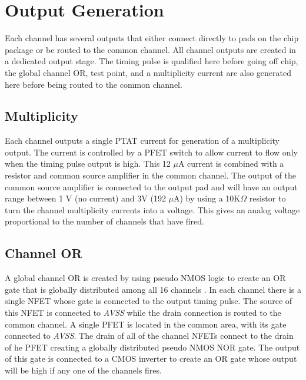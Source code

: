 \documentclass[12pt,oneside,final]{siuethesis}
\theoremstyle{definition}
\begin{document}
\section{Output Generation}
\par Each channel has several outputs that either connect directly to pads on the chip package or be routed to the common channel. All channel outputs are created in a dedicated output stage. The timing pulse is qualified here before going off chip, the global channel OR, test point, and a multiplicity current are also generated here before being routed to the common channel.
\subsection{Multiplicity}
\par Each channel outputs a single PTAT current for generation of a multiplicity output. The current is controlled by a PFET switch to allow current to flow only when the timing pulse output is high. This 12 $\mu$A current is combined with a resistor and common source amplifier in the common channel. The output of the common source amplifier is connected to the output pad and will have an output range between 1 V (no current) and 3V (192 $\mu$A) by using a 10K$\Omega$ resistor to turn the channel multiplicity currents into a voltage. This gives an analog voltage proportional to the number of channels that have fired. 

\subsection{Channel OR}
\par A global channel OR is created by using pseudo NMOS logic to create an OR gate that is globally distributed among all 16 channels \cite{NMOS}.  In each channel there is a single NFET whose gate is connected to the output timing pulse. The source of this NFET is connected to \emph{AVSS} while the drain connection is routed to the common channel. A single PFET is located in the common area, with its gate connected to \emph{AVSS}. The drain of all of the channel NFETs connect to the drain of he PFET creating a globally distributed pseudo NMOS NOR gate. The output of this gate is connected to a CMOS inverter to create an OR gate whose output will be high if any one of the channels fires.
\end{document}
